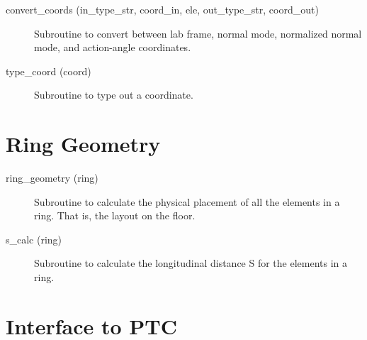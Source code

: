 \begin{description}

\item[convert\_coords (in\_type\_str, coord\_in, ele, out\_type\_str, coord\_out)] \Newline
Subroutine to convert between lab frame, normal mode, normalized normal mode, 
and action-angle coordinates. 

\item[type\_coord (coord)] \Newline
Subroutine to type out a coordinate. 

\end{description}

\section{Ring Geometry}
\label{r:geom}     

\begin{description}

\item[ring\_geometry (ring)] \Newline
Subroutine to calculate the physical placement of all the elements in a ring. 
That is, the layout on the floor. 

\item[s\_calc (ring)] \Newline
Subroutine to calculate the longitudinal distance S for the elements in a ring. 

\end{description}

\section{Interface to PTC}
\label{r:ptc}      

